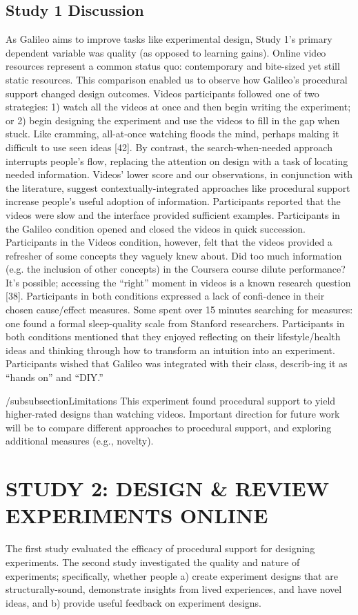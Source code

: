 \subsection{Study 1 Discussion}
As Galileo aims to improve tasks like experimental design, Study 1’s primary dependent variable was quality (as opposed to learning gains). Online video resources represent a common status quo: contemporary and bite-sized yet still static resources. This comparison enabled us to observe how Galileo’s procedural support changed design outcomes. Videos participants followed one of two strategies: 1) watch all the videos at once and then begin writing the experiment; or 2) begin designing the experiment and use the videos to fill in the gap when stuck. Like cramming, all-at-once watching floods the mind, perhaps making it difficult to use seen ideas [42]. By contrast, the search-when-needed approach interrupts people’s flow, replacing the attention on design with a task of locating needed information. Videos’ lower score and our observations, in conjunction with the literature, suggest contextually-integrated approaches like procedural support increase people’s useful adoption of information.   
Participants reported that the videos were slow and the interface provided sufficient examples. Participants in the Galileo condition opened and closed the videos in quick succession. Participants in the Videos condition, however, felt that the videos provided a refresher of some concepts they vaguely knew about. Did too much information (e.g. the inclusion of other concepts) in the Coursera course dilute performance? It’s possible; accessing the “right” moment in videos is a known research question [38]. 
Participants in both conditions expressed a lack of confi-dence in their chosen cause/effect measures. Some spent over 15 minutes searching for measures: one found a formal sleep-quality scale from Stanford researchers. Participants in both conditions mentioned that they enjoyed reflecting on their lifestyle/health ideas and thinking through how to transform an intuition into an experiment. Participants wished that Galileo was integrated with their class, describ-ing it as “hands on” and “DIY.” 

/subsubsection{Limitations}
This experiment found procedural support to yield higher-rated designs than watching videos. Important direction for future work will be to compare different approaches to procedural support, and exploring additional measures (e.g., novelty). 

\section{STUDY 2: DESIGN \& REVIEW EXPERIMENTS ONLINE}
The first study evaluated the efficacy of procedural support for designing experiments. The second study investigated the quality and nature of experiments; specifically, whether people a) create experiment designs that are structurally-sound, demonstrate insights from lived experiences, and have novel ideas, and b) provide useful feedback on experiment designs. 

